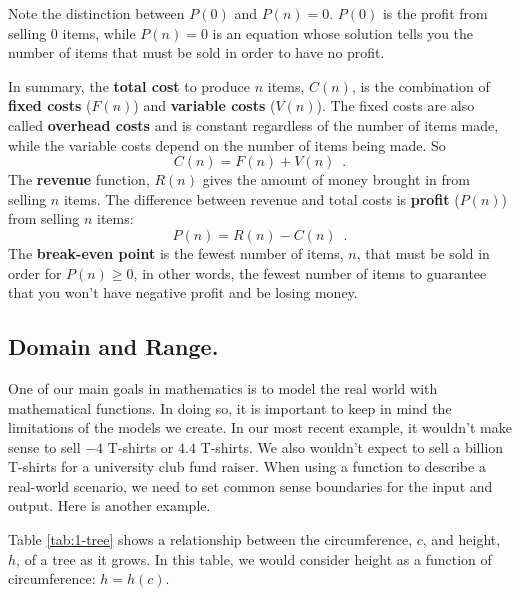 \begin{remark}
Note the distinction between $P(0)$ and $P(n)=0$. $P(0)$ is the profit from selling 0 items, while $P(n)=0$ is an equation whose solution tells you the number of items that must be sold in order to have no profit.
\end{remark}

\begin{definition}
In summary, the {\bf total cost} to produce $n$ items, $C(n)$, is the combination of {\bf fixed costs} ($F(n)$) and {\bf variable costs} ($V(n)$). The fixed costs are also called {\bf overhead costs} and is constant regardless of the number of items made, while the variable costs depend on the number of items being made. So
$$C(n) = F(n) + V(n)\enspace .$$
The {\bf revenue} function, $R(n)$ gives the amount of money brought in from selling $n$ items. The difference between revenue and total costs is {\bf profit} ($P(n)$) from selling $n$ items:
$$ P(n) = R(n) - C(n)\enspace .$$
The {\bf break-even point} is the fewest number of items, $n$, that must be sold in order for $P(n) \geq 0$, in other words, the fewest number of items to guarantee that you won't have negative profit and be losing money.
\end{definition}

\subsection{Domain and Range.}

One of our main goals in mathematics is to model the real world with mathematical functions. In doing so, it is important to keep in mind the limitations of the models we create. In our most recent example, it wouldn't make sense to sell $-4$ T-shirts or $4.4$ T-shirts. We also wouldn't expect to sell a billion T-shirts for a university club fund raiser. When using a function to describe a real-world scenario, we need to set common sense boundaries for the input and output. Here is another example.

Table \ref{tab:1-tree} shows a relationship between the circumference, $c$, and height, $h$, of a tree as it grows. In this table, we would consider height as a function of circumference: $h = h(c)$.


